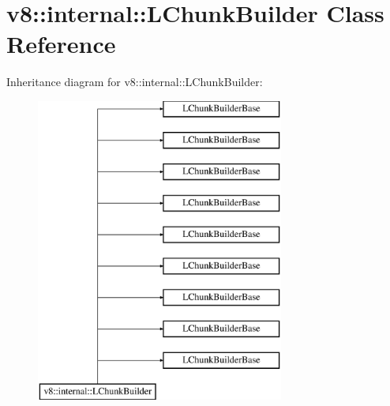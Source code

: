 \hypertarget{classv8_1_1internal_1_1_l_chunk_builder}{}\section{v8\+:\+:internal\+:\+:L\+Chunk\+Builder Class Reference}
\label{classv8_1_1internal_1_1_l_chunk_builder}
Inheritance diagram for v8\+:\+:internal\+:\+:L\+Chunk\+Builder\+:\begin{figure}[H]
\begin{center}
\leavevmode
\includegraphics[height=10.000000cm]{classv8_1_1internal_1_1_l_chunk_builder}
\end{center}
\end{figure}
